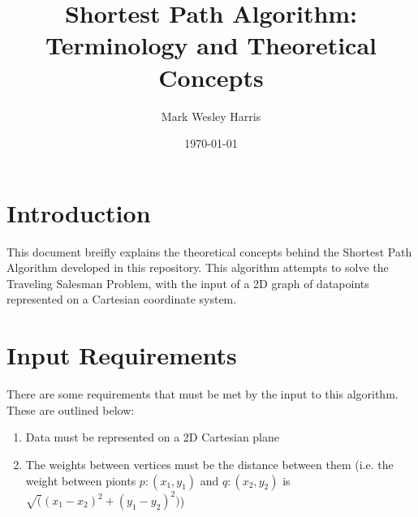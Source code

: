 \documentclass[12pt]{article}
\title{Shortest Path Algorithm:\\
Terminology and Theoretical Concepts}
\author{
Mark Wesley Harris
}
\date{\today}
\begin{document}
\maketitle

\section{Introduction}\label{sec:intro}
This document breifly explains the theoretical concepts behind the
Shortest Path Algorithm developed in this repository. This algorithm attempts
to solve the Traveling Salesman Problem, with the input of a 2D graph of datapoints
represented on a Cartesian coordinate system.

\section{Input Requirements}\label{sec:req}
There are some requirements that must be met by the input to this algorithm.
These are outlined below:
\begin{enumerate}
\item Data must be represented on a 2D Cartesian plane
\item The weights between vertices must be the distance between them
(i.e. the weight between pionts $p:(x_1, y_1)$ and $q:(x_2, y_2)$ is $\sqrt((x_1 - x_2)^2 + (y_1 - y_2)^2)$)
\end{enumerate}
\end{document}
